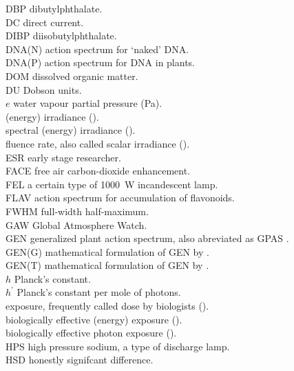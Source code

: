 \begin{tabbing}
DBP \> dibutylphthalate.\\
DC \> direct current.\\
DIBP \> diisobutylphthalate.\\
DNA(N) \> \UV action spectrum for `naked' DNA.\\
DNA(P) \> \UV action spectrum for DNA in plants.\\
DOM \> dissolved organic matter.\\
DU \> Dobson units.\\
$e$ \> water vapour partial pressure (Pa).\\
\irr \> (energy) irradiance (\watt).\\
\sirr \> spectral (energy) irradiance (\wattnm).\\
\flrat \> fluence rate, also called scalar irradiance (\watt).\\
ESR \> early stage researcher.\\
FACE \> free air carbon-dioxide enhancement.\\
FEL \> a certain type of 1000~W incandescent lamp.\\
FLAV \> \UV action spectrum for accumulation of flavonoids.\\
FWHM \> full-width half-maximum.\\
GAW \> Global Atmosphere Watch.\\
GEN \> generalized plant action spectrum, also abreviated as GPAS \autocite{Caldwell1971}.\\
GEN(G) \> mathematical formulation of GEN by \autocite{Green1974} .\\
GEN(T) \> mathematical formulation of GEN by \autocite{Thimijan1978}.\\
$h$ \> Planck's constant.\\
$h^\prime$ \> Planck's constant per mole of photons.\\
\exposure \> exposure, frequently called dose by biologists (\kjday).\\
\dose[BE]  \> biologically effective (energy) exposure (\kjday).\\
\qdose[BE] \> biologically effective photon exposure (\molday).\\
HPS \> high pressure sodium, a type of discharge lamp.\\
HSD \> honestly signifcant difference.\\

\end{tabbing}
